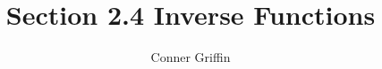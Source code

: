 \documentclass{ximera}
\title{Section 2.4 Inverse Functions}
\author{Conner Griffin}
\begin{document}
\begin{abstract}
    
\end{abstract}
\maketitle






\end{document}
